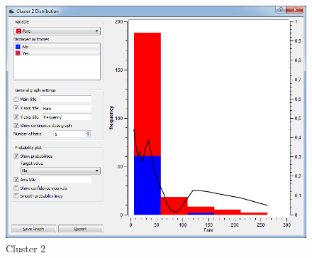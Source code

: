 \documentclass[a4paper,11pt]{article}
\begin{document}
\begin{figure}[h]
\begin{center}
		\includegraphics[scale=0.30]{ClusterDistribution/Cluster2/Fare}
	\end{center}
	\caption{Cluster 2}
	\label{ClusterTwo}
\end{figure}
\end{document}
